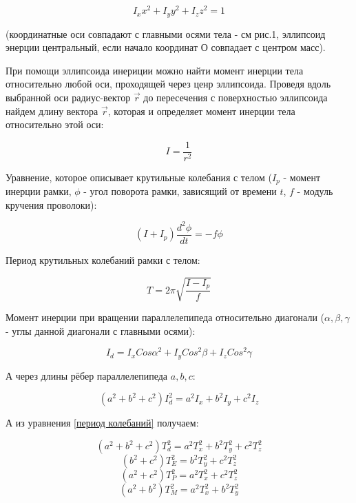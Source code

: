 \begin{equation} \label{уравнение эллипса}
    I_xx^2 + I_yy^2 + I_zz^2 = 1
\end{equation}

    (координатные оси совпадают с главными осями тела - см рис.1, эллипсоид энерции центральный, если начало координат О совпадает с центром масс).
    
    При помощи эллипсоида инериции можно найти момент инерции тела относительно любой оси, проходящей через ценр эллипсоида. Проведя вдоль выбранной оси радиус-вектор $\Vec{r}$ до пересечения с поверхностью эллипсоида найдем длину вектора $\Vec{r}$, которая и определяет момент инерции тела относительно этой оси:
    
\begin{equation} \label{момент через р}
    I = \frac{1}{r^2}
\end{equation}

    Уравнение, которое описывает крутильные колебания с телом ($I_p$ - момент инерции рамки, $\phi$ - угол поворота рамки, зависящий от времени $t$, $f$ - модуль кручения проволоки):
    
\begin{equation} \label{уравнение колебаний}
    (I + I_p)\frac{d^2\phi}{dt} = -f\phi
\end{equation}

    Период крутильных колебаний рамки с телом:
    
\begin{equation} \label{период колебаний}
    T = 2\pi\sqrt{\frac{I-I_p}{f}}
\end{equation}

    Момент инерции при вращении параллелепипеда относительно диагонали ($\alpha, \beta, \gamma$ - углы данной диагонали с главными осями):
    
\begin{equation} \label{момент отн диаг общ}
    I_d = I_x Cos\alpha^2 + I_y Cos^2\beta + I_z Cos^2\gamma 
\end{equation}
    
    А через длины рёбер параллелепипеда $a, b, c$:
    
\begin{equation} \label{момент отн диаг}
    (a^2 + b^2 + c^2) I_d^2 = a^2 I_x + b^2 I_y + c^2 I_z 
\end{equation}

    А из уравнения  \eqref{период колебаний} получаем:
    
\begin{equation} \label{момент отн диаг через т}
    (a^2 + b^2 + c^2) T_d^2 = a^2 T_x^2 + b^2 T_y^2 + c^2 T_z^2 
\end{equation}
\begin{equation}(b^2+c^2)T_E^2 = b^2T_y^2 + c^2T_z^2\end{equation}
\begin{equation}(a^2+c^2)T_P^2 = a^2T_x^2 + c^2T_z^2\end{equation}
\begin{equation}(a^2+b^2)T_M^2 = a^2T_x^2 + b^2T_y^2\end{equation}

